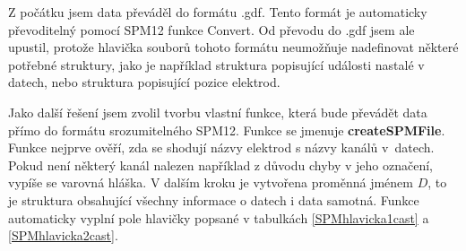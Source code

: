 Z počátku jsem data převáděl do formátu .gdf. Tento formát je automaticky převoditelný pomocí SPM12 funkce Convert. Od převodu do .gdf jsem ale upustil, protože hlavička souborů tohoto formátu neumožňuje nadefinovat některé potřebné struktury, jako je například struktura popisující události nastalé v datech, nebo struktura popisující pozice elektrod.

Jako další řešení jsem zvolil tvorbu vlastní funkce, která bude převádět data přímo do formátu srozumitelného SPM12. Funkce se jmenuje \textbf{createSPMFile}. Funkce nejprve ověří, zda se shodují názvy elektrod s názvy kanálů v~datech. Pokud není některý kanál nalezen například z důvodu chyby v jeho označení, vypíše se varovná hláška. V dalším kroku je vytvořena proměnná jménem $D$, to je struktura obsahující všechny informace o datech i data samotná. Funkce automaticky vyplní pole hlavičky popsané v tabulkách 
\ref{SPMhlavicka1cast} a \ref{SPMhlavicka2cast}.

